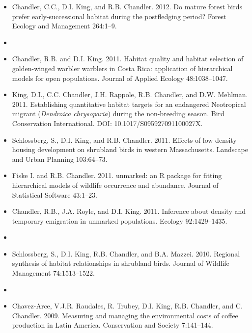 \begin{itemize}
\item Chandler, C.C., D.I. King, and R.B. Chandler. 2012. Do mature
  forest birds prefer early-successional habitat
  during the postfledging period? Forest Ecology and Management 264:1--9.

\item[] { \\}

\item Chandler, R.B. and D.I. King. 2011. Habitat quality and
  habitat selection of golden-winged warbler warblers in Costa Rica:
  application of hierarchical models for open populations. Journal of
  Applied Ecology 48:1038--1047.

\item King, D.I., C.C. Chandler, J.H. Rappole, R.B. Chandler, and
  D.W. Mehlman. 2011. Establishing quantitative habitat targets
  for an endangered Neotropical migrant ({\it Dendroica chrysoparia})
  during the non-breeding season. Bird Conservation
  International. DOI: 10.1017/S095927091100027X.

\item Schlossberg, S., D.I. King, and R.B. Chandler. 2011. Effects
  of low-density housing development on shrubland birds
  in western Massachusetts. Landscape and Urban Planning 103:64--73.

\item Fiske I. and R.B. Chandler. 2011. unmarked: an R package
  for fitting hierarchical models of wildlife occurrence and
  abundance. Journal of Statistical Software 43:1--23.

\item Chandler, R.B., J.A. Royle, and D.I. King. 2011. Inference
  about density and temporary emigration in unmarked
  populations. Ecology 92:1429--1435.


\item[] { \\}

\item Schlossberg, S., D.I. King, R.B. Chandler, and
  B.A. Mazzei. 2010. Regional synthesis of habitat relationships in
  shrubland birds. Journal of Wildlife Management 74:1513--1522.

\item[] { \\}

\item Chavez-Arce, V.J.R. Raudales, R. Trubey, D.I. King,
  R.B. Chandler, and C. Chandler. 2009. Measuring and managing the
  environmental costs of coffee production in Latin
  America. Conservation and Society 7:141--144.


\end{itemize}

